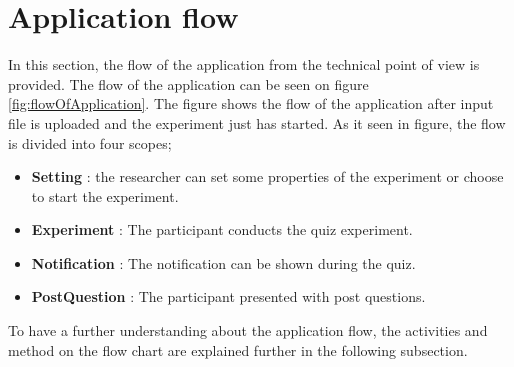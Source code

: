 %

\section{Application flow}
In this section, the flow of the application from the technical point of view is provided.
The flow of the application can be seen
on figure \ref{fig:flowOfApplication}. The figure shows the flow of the application after input file is uploaded and
the experiment just has started.
As it seen in figure, the flow is divided into four scopes;
\begin{itemize}
\item \textbf{Setting}  : the researcher can set some properties of the experiment or choose to start the experiment.
\item \textbf{Experiment} : The participant conducts the quiz experiment.
\item \textbf{Notification} : The notification can be shown during the quiz.
\item \textbf{PostQuestion} : The participant presented with post questions.
\end{itemize}
\par

To have a further understanding about the application flow, the activities and method on the flow chart are explained further in the following subsection.



